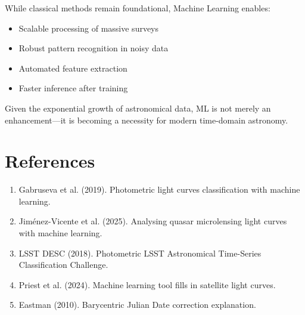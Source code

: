 \documentclass[12pt]{article}
\begin{document}
While classical methods remain foundational, Machine Learning enables:

\begin{itemize}
    \item Scalable processing of massive surveys
    \item Robust pattern recognition in noisy data
    \item Automated feature extraction
    \item Faster inference after training
\end{itemize}

Given the exponential growth of astronomical data, ML is not merely an enhancement—it is becoming a necessity for modern time-domain astronomy.

\newpage
\section{References}

\begin{enumerate}
\item Gabruseva et al. (2019). Photometric light curves classification with machine learning.
\item Jiménez-Vicente et al. (2025). Analysing quasar microlensing light curves with machine learning.
\item LSST DESC (2018). Photometric LSST Astronomical Time-Series Classification Challenge.
\item Priest et al. (2024). Machine learning tool fills in satellite light curves.
\item Eastman (2010). Barycentric Julian Date correction explanation.
\end{enumerate}
\end{document}
